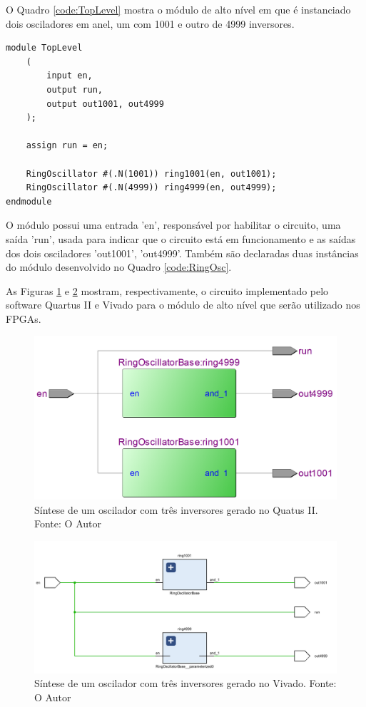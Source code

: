 O Quadro \ref{code:TopLevel} mostra o módulo de alto nível em que é instanciado dois osciladores em anel, um com 1001 e outro de 4999 inversores. 

\begin{lstlisting}[label={code:TopLevel}, style=VerilogStyle, caption={Estanciamento dos Módulos. Fonte: O Autor}]
module TopLevel
	(
		input en,
		output run,
		output out1001, out4999
	);
	
	assign run = en;

	RingOscillator #(.N(1001)) ring1001(en, out1001);
	RingOscillator #(.N(4999)) ring4999(en, out4999);
endmodule
\end{lstlisting}

O módulo possui uma entrada 'en', responsável por habilitar o circuito, uma saída 'run', usada para indicar que o circuito está em funcionamento e as saídas dos dois osciladores 'out1001', 'out4999'. Também são declaradas duas instâncias do módulo desenvolvido no Quadro \ref{code:RingOsc}.

As Figuras \ref{fig:DE2RtlSchem} e \ref{fig:ZedRtlSchem1} mostram, respectivamente, o circuito implementado pelo software Quartus II e Vivado para o módulo de alto nível que serão utilizado nos FPGAs.

\begin{figure}[H]
    \centering
    \includegraphics[scale=0.25]{figures/Metodologia/DE2_RTL_Schematic.png}
    \caption{Síntese de um oscilador com três inversores gerado no Quatus II. Fonte: O Autor}
    \label{fig:DE2RtlSchem}
\end{figure}

\begin{figure}[H]
    \centering
    \includegraphics[width=\linewidth]{figures/Metodologia/ZedBoard_RTL_Schematic.png}
    \caption{Síntese de um oscilador com três inversores gerado no Vivado. Fonte: O Autor}
    \label{fig:ZedRtlSchem1}
\end{figure}


